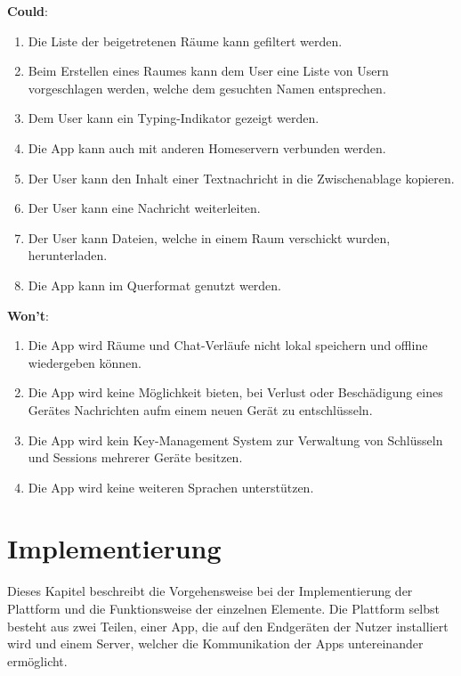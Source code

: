     \textbf{Could}:
    \begin{enumerate}[label={\roman*.}, leftmargin=2.5cm]
        \item Die Liste der beigetretenen Räume kann gefiltert werden.
        \item Beim Erstellen eines Raumes kann dem User eine Liste von Usern vorgeschlagen werden, welche dem gesuchten Namen entsprechen.
        \item Dem User kann ein Typing-Indikator gezeigt werden.
        \item Die App kann auch mit anderen Homeservern verbunden werden.
        \item Der User kann den Inhalt einer Textnachricht in die Zwischenablage kopieren.
        \item Der User kann eine Nachricht weiterleiten.
        \item Der User kann Dateien, welche in einem Raum verschickt wurden, herunterladen.
        \item Die App kann im Querformat genutzt werden.
    \end{enumerate}

    \textbf{Won't}:
    \begin{enumerate}[label={\roman*.}, leftmargin=2.5cm]
        \item Die App wird Räume und Chat-Verläufe nicht lokal speichern und offline wiedergeben können.
        \item Die App wird keine Möglichkeit bieten, bei Verlust oder Beschädigung eines Gerätes Nachrichten aufm einem neuen Gerät zu entschlüsseln.
        \item Die App wird kein Key-Management System zur Verwaltung von Schlüsseln und Sessions mehrerer Geräte besitzen.
        \item Die App wird keine weiteren Sprachen unterstützen.
    \end{enumerate}

    \newpage
    \chapter{Implementierung}\label{ch:implementierung}
    Dieses Kapitel beschreibt die Vorgehensweise bei der Implementierung der Plattform und die Funktionsweise der einzelnen Elemente.
    Die Plattform selbst besteht aus zwei Teilen, einer App, die auf den Endgeräten der Nutzer installiert wird und einem Server, welcher die Kommunikation der Apps untereinander ermöglicht.


